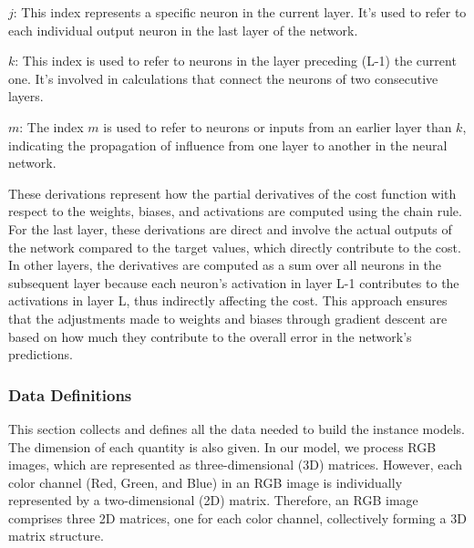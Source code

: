 \documentclass[12pt]{article}
\begin{document}
$j$: This index represents a specific neuron in the current layer. 
It's used to refer to each individual output neuron in the last layer of the network.

$k$: This index is used to refer to neurons in the layer preceding 
(L-1) the current one. It's involved in calculations that connect the neurons of two consecutive layers.

$m$: The index $m$ is used to refer to neurons or inputs from an earlier layer than $k$, 
indicating the propagation of influence from one layer to another in the neural network.

These derivations represent how the partial derivatives of the cost function with respect 
to the weights, biases, and activations are computed using the chain rule. For the last layer, 
these derivations are direct and involve the actual outputs of the network compared to the 
target values, which directly contribute to the cost. In other layers, the derivatives are 
computed as a sum over all neurons in the subsequent layer because each neuron's activation in 
layer L-1 contributes to the activations in layer L, thus indirectly affecting the cost. This 
approach ensures that the adjustments made to weights and biases through gradient descent are 
based on how much they contribute to the overall error in the network's predictions.


\subsubsection{Data Definitions}\label{sec_datadef}



This section collects and defines all the data needed to build the instance
models. The dimension of each quantity is also given.  
In our model, we process RGB images, which are represented as three-dimensional 
(3D) matrices. However, each color channel (Red, Green, and Blue) in an RGB 
image is individually represented by a two-dimensional (2D) matrix. Therefore, 
an RGB image comprises three 2D matrices, one for each color channel, collectively 
forming a 3D matrix structure.
\end{document}
